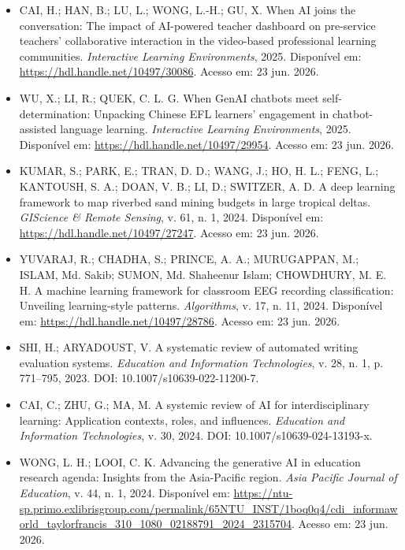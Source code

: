 \documentclass[english]{textolivre}
\begin{document}
\begin{itemize}
\item[] CAI, H.; HAN, B.; LU, L.; WONG, L.-H.; GU, X. When AI joins the conversation: The impact of AI-powered teacher dashboard on pre-service teachers’ collaborative interaction in the video-based professional learning communities. \textit{Interactive Learning Environments}, 2025. Disponível em: \url{https://hdl.handle.net/10497/30086}. Acesso em: 23 jun. 2026.

\item[] WU, X.; LI, R.; QUEK, C. L. G. When GenAI chatbots meet self-determination: Unpacking Chinese EFL learners’ engagement in chatbot-assisted language learning. \textit{Interactive Learning Environments}, 2025. Disponível em: \url{https://hdl.handle.net/10497/29954}. Acesso em: 23 jun. 2026.

\item[] KUMAR, S.; PARK, E.; TRAN, D. D.; WANG, J.; HO, H. L.; FENG, L.; KANTOUSH, S. A.; DOAN, V. B.; LI, D.; SWITZER, A. D. A deep learning framework to map riverbed sand mining budgets in large tropical deltas. \textit{GIScience \& Remote Sensing}, v. 61, n. 1, 2024. Disponível em: \url{https://hdl.handle.net/10497/27247}. Acesso em: 23 jun. 2026.

\item[] YUVARAJ, R.; CHADHA, S.; PRINCE, A. A.; MURUGAPPAN, M.; ISLAM, Md. Sakib; SUMON, Md. Shaheenur Islam; CHOWDHURY, M. E. H. A machine learning framework for classroom EEG recording classification: Unveiling learning-style patterns. \textit{Algorithms}, v. 17, n. 11, 2024. Disponível em: \url{https://hdl.handle.net/10497/28786}. Acesso em: 23 jun. 2026.

\item[] SHI, H.; ARYADOUST, V. A systematic review of automated writing evaluation systems. \textit{Education and Information Technologies}, v. 28, n. 1, p. 771--795, 2023. DOI: 10.1007/s10639-022-11200-7.

\item[] CAI, C.; ZHU, G.; MA, M. A systemic review of AI for interdisciplinary learning: Application contexts, roles, and influences. \textit{Education and Information Technologies}, v. 30, 2024. DOI: 10.1007/s10639-024-13193-x.

\item[] WONG, L. H.; LOOI, C. K. Advancing the generative AI in education research agenda: Insights from the Asia-Pacific region. \textit{Asia Pacific Journal of Education}, v. 44, n. 1, 2024. Disponível em: \url{https://ntu-sp.primo.exlibrisgroup.com/permalink/65NTU_INST/1boq0q4/cdi_informaworld_taylorfrancis_310_1080_02188791_2024_2315704}. Acesso em: 23 jun. 2026.


\end{itemize}
\end{document}
